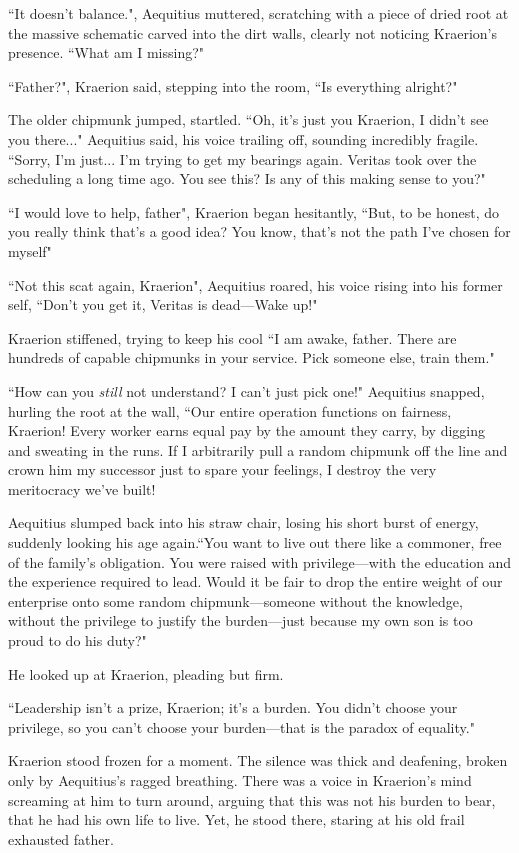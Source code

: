 ``It doesn't balance.", Aequitius muttered, scratching with a piece of dried root at the massive schematic carved into the dirt walls, clearly not noticing Kraerion's presence. ``What am I missing?"

``Father?", Kraerion said, stepping into the room, ``Is everything alright?"

The older chipmunk jumped, startled. ``Oh, it's just you Kraerion, I didn't see you there..." Aequitius said, his voice trailing off, sounding incredibly fragile. ``Sorry, I'm just... I'm trying to get my bearings again. Veritas took over the scheduling a long time ago. You see this? Is any of this making sense to you?"

``I would love to help, father", Kraerion began hesitantly, ``But, to be honest, do you really think that's a good idea? You know, that's not the path I've chosen for myself"

``Not this scat again, Kraerion", Aequitius roared, his voice rising into his former self, ``Don't you get it, Veritas is dead---Wake up!"

Kraerion stiffened, trying to keep his cool ``I am awake, father. There are hundreds of capable chipmunks in your service. Pick someone else, train them."

``How can you \textit{still} not understand? I can't just pick one!" Aequitius snapped, hurling the root at the wall, ``Our entire operation functions on fairness, Kraerion! Every worker earns equal pay by the amount they carry, by digging and sweating in the runs. If I arbitrarily pull a random chipmunk off the line and crown him my successor just to spare your feelings, I destroy the very meritocracy we've built!

Aequitius slumped back into his straw chair, losing his short burst of energy, suddenly looking his age again.``You want to live out there like a commoner, free of the family's obligation. You were raised with privilege---with the education and the experience required to lead. Would it be fair to drop the entire weight of our enterprise onto some random chipmunk---someone without the knowledge, without the privilege to justify the burden---just because my own son is too proud to do his duty?"

He looked up at Kraerion, pleading but firm.

``Leadership isn't a prize, Kraerion; it's a burden. You didn't choose your privilege, so you can't choose your burden---that is the paradox of equality."

Kraerion stood frozen for a moment. The silence was thick and deafening, broken only by Aequitius's ragged breathing. There was a voice in Kraerion's mind screaming at him to turn around, arguing that this was not his burden to bear, that he had his own life to live. Yet, he stood there, staring at his old frail exhausted father.

